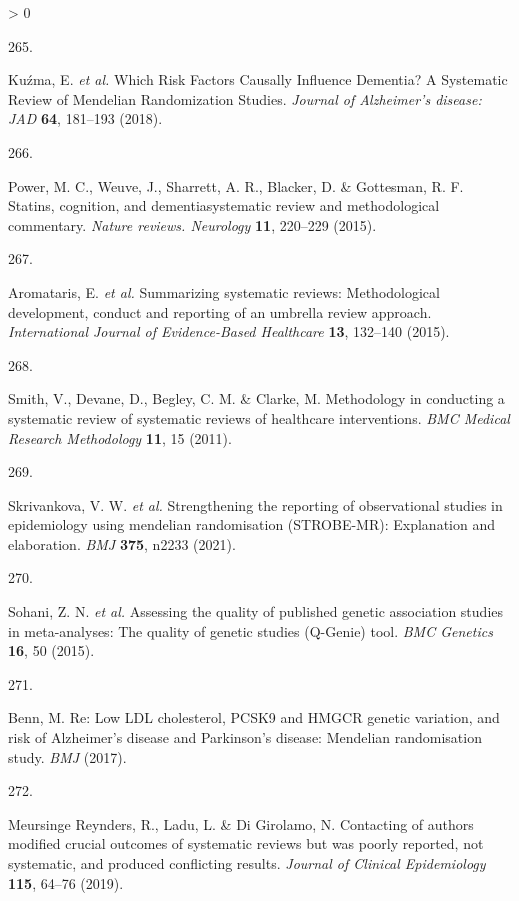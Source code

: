 \documentclass[a4paper, twoside]{templates/ociamthesis}
\newlength{\cslhangindent}
\newlength{\csllabelwidth}
\newenvironment{CSLReferences}[3] %
 {%
  \setlength{\parindent}{0pt}
  \ifodd #1 \everypar{\setlength{\hangindent}{\cslhangindent}}\ignorespaces\fi
  \ifnum #2 > 0
  \setlength{\parskip}{#2\baselineskip}
  \fi
 }%
 {}
\newcommand{\CSLLeftMargin}[1]{\parbox[t]{\maxof{\widthof{#1}}{\csllabelwidth}}{#1}}
\newcommand{\CSLRightInline}[1]{\parbox[t]{\linewidth - \csllabelwidth}{#1}}
\begin{document}
\begin{CSLReferences}{0}{0}
\leavevmode\hypertarget{ref-kuzma2018risk}{}%
\CSLLeftMargin{265. }
\CSLRightInline{Kuźma, E. \emph{et al.} Which {Risk Factors Causally Influence Dementia}? A {Systematic Review} of {Mendelian Randomization Studies}. \emph{Journal of Alzheimer's disease: JAD} \textbf{64}, 181--193 (2018).}

\leavevmode\hypertarget{ref-power2015}{}%
\CSLLeftMargin{266. }
\CSLRightInline{Power, M. C., Weuve, J., Sharrett, A. R., Blacker, D. \& Gottesman, R. F. Statins, cognition, and dementia{}systematic review and methodological commentary. \emph{Nature reviews. Neurology} \textbf{11}, 220--229 (2015).}

\leavevmode\hypertarget{ref-aromataris2015}{}%
\CSLLeftMargin{267. }
\CSLRightInline{Aromataris, E. \emph{et al.} Summarizing systematic reviews: Methodological development, conduct and reporting of an umbrella review approach. \emph{International Journal of Evidence-Based Healthcare} \textbf{13}, 132--140 (2015).}

\leavevmode\hypertarget{ref-smith2011}{}%
\CSLLeftMargin{268. }
\CSLRightInline{Smith, V., Devane, D., Begley, C. M. \& Clarke, M. Methodology in conducting a systematic review of systematic reviews of healthcare interventions. \emph{BMC Medical Research Methodology} \textbf{11}, 15 (2011).}

\leavevmode\hypertarget{ref-skrivankova2021}{}%
\CSLLeftMargin{269. }
\CSLRightInline{Skrivankova, V. W. \emph{et al.} Strengthening the reporting of observational studies in epidemiology using mendelian randomisation ({STROBE}-{MR}): Explanation and elaboration. \emph{BMJ} \textbf{375}, n2233 (2021).}

\leavevmode\hypertarget{ref-sohani2015}{}%
\CSLLeftMargin{270. }
\CSLRightInline{Sohani, Z. N. \emph{et al.} Assessing the quality of published genetic association studies in meta-analyses: The quality of genetic studies ({Q}-{Genie}) tool. \emph{BMC Genetics} \textbf{16}, 50 (2015).}

\leavevmode\hypertarget{ref-benn2017comment}{}%
\CSLLeftMargin{271. }
\CSLRightInline{Benn, M. Re: Low {LDL} cholesterol, {PCSK9} and {HMGCR} genetic variation, and risk of {Alzheimer}'s disease and {Parkinson}'s disease: Mendelian randomisation study. \emph{BMJ} (2017).}

\leavevmode\hypertarget{ref-meursingereynders2019}{}%
\CSLLeftMargin{272. }
\CSLRightInline{Meursinge Reynders, R., Ladu, L. \& Di Girolamo, N. Contacting of authors modified crucial outcomes of systematic reviews but was poorly reported, not systematic, and produced conflicting results. \emph{Journal of Clinical Epidemiology} \textbf{115}, 64--76 (2019).}


\end{CSLReferences}
\end{document}

